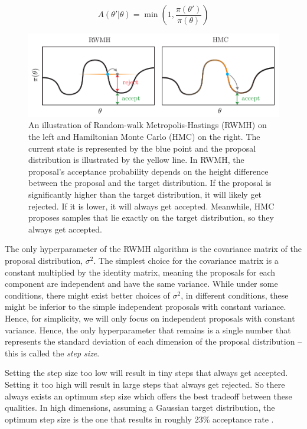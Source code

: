 \documentclass[12pt]{article}
\begin{document}
{\begin{equation}
A(\theta'|\theta) = \min \left(1, \frac{\pi(\theta')}{\pi(\theta)} \right)
\label{eq_rwmh_accept_prob}
\end{equation}

\begin{figure}[ht]
\centering
\includegraphics[width=14cm]{illustrations/rwmh_vs_hmc.pdf}
\caption{An illustration of Random-walk Metropolis-Hastings (RWMH) on the left and Hamiltonian Monte Carlo (HMC) on the right. The current state is represented by the blue point and the proposal distribution is illustrated by the yellow line. In RWMH, the proposal's acceptance probability depends on the height difference between the proposal and the target distribution. If the proposal is significantly higher than the target distribution, it will likely get rejected. If it is lower, it will always get accepted. Meanwhile, HMC proposes samples that lie exactly on the target distribution, so they always get accepted.}
\label{fig_rwmh_vs_hmc}
\end{figure}

The only hyperparameter of the RWMH algorithm is the covariance matrix of the proposal distribution, $\sigma^2$. The simplest choice for the covariance matrix is a constant multiplied by the identity matrix, meaning the proposals for each component are independent and have the same variance. While under some conditions, there might exist better choices of $\sigma^2$, in different conditions, these might be inferior to the simple independent proposals with constant variance. Hence, for simplicity, we will only focus on independent proposals with constant variance. Hence, the only hyperparameter that remains is a single number that represents the standard deviation of each dimension of the proposal distribution -- this is called the \textit{step size}.

Setting the step size too low will result in tiny steps that always get accepted. Setting it too high will result in large steps that always get rejected. So there always exists an optimum step size which offers the best tradeoff between these qualities. In high dimensions, assuming a Gaussian target distribution, the optimum step size is the one that results in roughly $23\%$ acceptance rate \cite{rwmh_scaling}.

}
\end{document}
